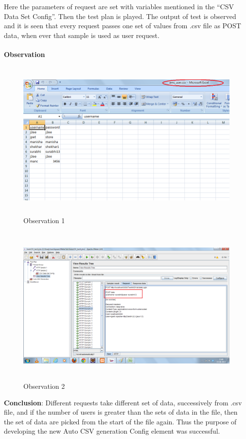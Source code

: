 \documentclass[12pt]{book}
\begin{document}
  Here the parameters of request are set with variables mentioned in the ``CSV Data Set Config''.
  Then the test plan is played. The output of test is observed and it is seen that every request passes
  one set of values from .csv file as POST data, when ever that sample is used as user request.\\
  \\
  \textbf{Observation}
  
  \begin{figure}[H]
   \centering
   \includegraphics[width=15cm, height=8cm]{images/autocsvgeneration_86}
   \caption{Observation 1\label{fig:fig26_JMeter}}
  \end{figure}   
  
  \begin{figure}[H]
   \centering
   \includegraphics[width=15cm, height=8cm]{images/autocsvgeneration_87}
   \caption{Observation 2\label{fig:fig27_JMeter}}
  \end{figure}   
  
  \textbf{Conclusion}:
  Different requests take different set of data, successively from .csv file, and if the number of
  users is greater than the sets of data in the file, then the set of data are picked from the start of the
  file again. Thus the purpose of developing the new Auto CSV generation Config element was
  successful.
  
\end{document}
